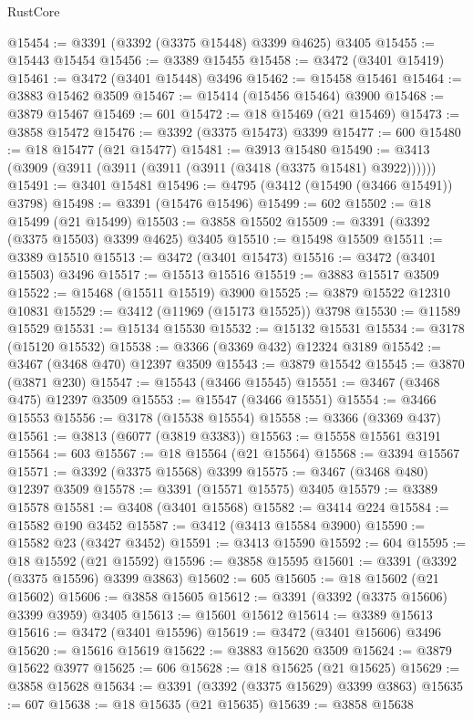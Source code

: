 \begin{lexlean}{RustCore}
\begin{coremodule}
@15454 := @3391 (@3392 (@3375 @15448) @3399 @4625) @3405
@15455 := @15443 @15454
@15456 := @3389 @15455
@15458 := @3472 (@3401 @15419)
@15461 := @3472 (@3401 @15448) @3496
@15462 := @15458 @15461
@15464 := @3883 @15462 @3509
@15467 := @15414 (@15456 @15464) @3900
@15468 := @3879 @15467
@15469 := 601
@15472 := @18 @15469 (@21 @15469)
@15473 := @3858 @15472
@15476 := @3392 (@3375 @15473) @3399
@15477 := 600
@15480 := @18 @15477 (@21 @15477)
@15481 := @3913 @15480
@15490 := @3413 (@3909 (@3911 (@3911 (@3911 (@3911 (@3418 (@3375 @15481) @3922))))))
@15491 := @3401 @15481
@15496 := @4795 (@3412 (@15490 (@3466 @15491)) @3798)
@15498 := @3391 (@15476 @15496)
@15499 := 602
@15502 := @18 @15499 (@21 @15499)
@15503 := @3858 @15502
@15509 := @3391 (@3392 (@3375 @15503) @3399 @4625) @3405
@15510 := @15498 @15509
@15511 := @3389 @15510
@15513 := @3472 (@3401 @15473)
@15516 := @3472 (@3401 @15503) @3496
@15517 := @15513 @15516
@15519 := @3883 @15517 @3509
@15522 := @15468 (@15511 @15519) @3900
@15525 := @3879 @15522 @12310 @10831
@15529 := @3412 (@11969 (@15173 @15525)) @3798
@15530 := @11589 @15529
@15531 := @15134 @15530
@15532 := @15132 @15531
@15534 := @3178 (@15120 @15532)
@15538 := @3366 (@3369 @432) @12324 @3189
@15542 := @3467 (@3468 @470) @12397 @3509
@15543 := @3879 @15542
@15545 := @3870 (@3871 @230)
@15547 := @15543 (@3466 @15545)
@15551 := @3467 (@3468 @475) @12397 @3509
@15553 := @15547 (@3466 @15551)
@15554 := @3466 @15553
@15556 := @3178 (@15538 @15554)
@15558 := @3366 (@3369 @437)
@15561 := @3813 (@6077 (@3819 @3383))
@15563 := @15558 @15561 @3191
@15564 := 603
@15567 := @18 @15564 (@21 @15564)
@15568 := @3394 @15567
@15571 := @3392 (@3375 @15568) @3399
@15575 := @3467 (@3468 @480) @12397 @3509
@15578 := @3391 (@15571 @15575) @3405
@15579 := @3389 @15578
@15581 := @3408 (@3401 @15568)
@15582 := @3414 @224
@15584 := @15582 @190 @3452
@15587 := @3412 (@3413 @15584 @3900)
@15590 := @15582 @23 (@3427 @3452)
@15591 := @3413 @15590
@15592 := 604
@15595 := @18 @15592 (@21 @15592)
@15596 := @3858 @15595
@15601 := @3391 (@3392 (@3375 @15596) @3399 @3863)
@15602 := 605
@15605 := @18 @15602 (@21 @15602)
@15606 := @3858 @15605
@15612 := @3391 (@3392 (@3375 @15606) @3399 @3959) @3405
@15613 := @15601 @15612
@15614 := @3389 @15613
@15616 := @3472 (@3401 @15596)
@15619 := @3472 (@3401 @15606) @3496
@15620 := @15616 @15619
@15622 := @3883 @15620 @3509
@15624 := @3879 @15622 @3977
@15625 := 606
@15628 := @18 @15625 (@21 @15625)
@15629 := @3858 @15628
@15634 := @3391 (@3392 (@3375 @15629) @3399 @3863)
@15635 := 607
@15638 := @18 @15635 (@21 @15635)
@15639 := @3858 @15638

\end{coremodule}
\end{lexlean}
